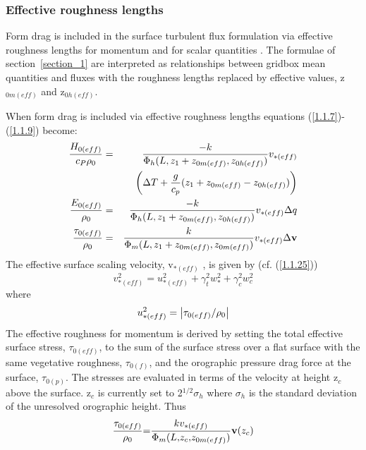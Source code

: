 \documentclass{UMDP_article}
\begin{document}
\subsubsection{Effective roughness lengths}\label{section_2.1}
Form drag is included in the surface turbulent flux formulation via
effective roughness lengths for momentum \cite[]{wood93} and for
scalar quantities \cite[]{hewer1998}. The formulae of
section~\ref{section_1} are interpreted as relationships between
gridbox mean quantities and fluxes with the roughness lengths replaced
by effective values, z$_{0m(eff)}$ and z$_{0h(eff)}$.

When form drag is included via effective roughness lengths equations
(\ref{1.1.7})-(\ref{1.1.9}) become:
\begin{eqnarray}
  \frac{ H_{0(eff)} }{ c_P  \rho _0 }&=&\frac{-k}{ \Phi _h (L ,  z_1 +  z_{0m(eff)} ,  z_{0h(eff)} )}  v_{\ast (eff)}\nonumber\\
  && \left( {\Delta T + \frac{g}{c_p }( z_1 +  z_{0m(eff)} - z_{0h(eff)} )} \right)
  \label{2.1.1} \\
  \frac{ E_{0(eff)} }{ \rho _0 }&=&\frac{-k}{ \Phi _h (L ,  z_1 +  z_{0m(eff)} ,  z_{0h(eff)} )}  v_{\ast (eff)} \Delta q
  \label{2.1.2} \\
  \frac{ {\rm {\bf \tau }}_{{0(eff)}} }{ \rho _{0} }&=&\frac{k}{ \Phi _m (L ,  z_1 +  z_{0m(eff)} ,  z_{0m(eff)} )}  v_{\ast (eff)} \Delta {\rm {\bf v}}
  \label{2.1.3}
\end{eqnarray}
The effective surface scaling velocity, v$_{\ast (eff)}$ , is given by
(cf.  (\ref{1.1.25}))
\begin{equation}
  v_{\ast (eff)}^2 =  u_{\ast (eff)}^2 +  \gamma _t^2  w_\ast ^2 +  \gamma _c^2  w_c^2
  \label{2.1.4}
\end{equation}
where
\begin{equation}
  u_{\ast (eff)}^2 = \left| { {\rm {\bf \tau }}_{{0(eff)}} {/} \rho _{0} } \right|
  \label{2.1.5}
\end{equation}
The effective roughness for momentum is derived by setting the total
effective surface stress, \textbf{$\tau $}$_{0(eff)}$, to the sum of
the surface stress over a flat surface with the same vegetative
roughness, \textbf{$\tau $}$_{0(f)}$, and the orographic pressure drag
force at the surface, \textbf{$\tau $}$_{0(p)}$. The stresses are
evaluated in terms of the velocity at height z$_{c}$ above the
surface. z$_{c}$ is currently set to 2$^{1/2}\sigma _{h}$ where
$\sigma _{h}$ is the standard deviation of the unresolved orographic
height. Thus
\begin{equation}
  \frac{ {\rm {\bf \tau }}_{{0(eff)}} }{ \rho _{0} }{ = }\frac{{k } {v}_{{\ast (eff)}} }{ \Phi _{m} {(L , } {z}_{c} { , } {z}_{{0m(eff)}} {)}}{ }{\rm {\bf v}}{(} {z}_{c} {)}
  \label{2.1.6}
\end{equation}
\end{document}
